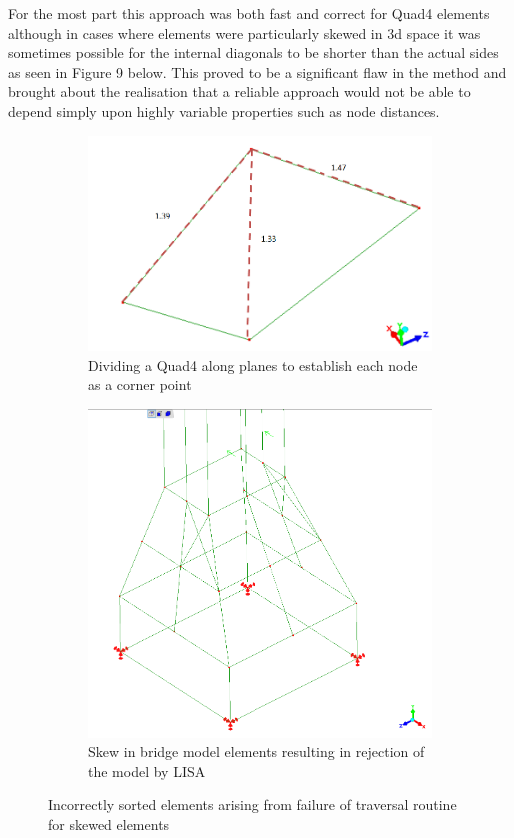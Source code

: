 \noindent
For the most part this approach was both fast and correct for Quad4 elements although in cases where elements were particularly skewed in 3d space it was sometimes possible for the internal diagonals to be shorter than the actual sides as seen in Figure 9 below. This proved to be a significant flaw in the method and brought about the realisation that a reliable approach would not be able to depend simply upon highly variable properties such as node distances. \\ 

\begin{figure}[!h]
\centering
\begin{subfigure}{.5\textwidth}
  \centering
  \includegraphics[width=0.9\linewidth]{../Graphics/SkewedElementIssues.png}
  \caption{Dividing a Quad4 along planes to establish each node as a corner point}
  \label{fig:sub1}
\end{subfigure}%
\begin{subfigure}{.5\textwidth}
  \centering
  \includegraphics[width=0.7\linewidth]{../Graphics/ElementSkewOnBridge.png}
  \caption{Skew in bridge model elements resulting in rejection of the model by LISA}
  \label{fig:sub2}
\end{subfigure}
\caption{Incorrectly sorted elements arising from failure of traversal routine for skewed elements}
\label{fig:test}
\end{figure}




